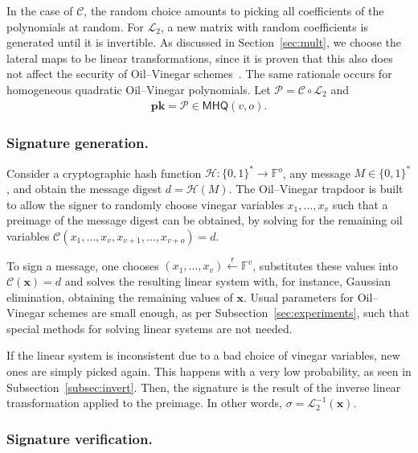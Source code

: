\documentclass[draft, 12pt, a4paper, oneside]{memoir}
\newcommand{\random}{\overset{\mathsf{r}}{\gets}}
\theoremstyle{definition}
\begin{document}
In the case of $\mathcal{C}$, the random choice amounts to picking all coefficients of the polynomials at random. For $\mathcal{L}_{2}$, a new matrix with random coefficients is generated until it is invertible. As discussed in Section~\ref{sec:mult}, we choose the lateral maps to be linear transformations, since it is proven that this also does not affect the security of Oil--Vinegar schemes~\cite[Section 3.1]{Braeken:200502}. The same rationale occurs for homogeneous quadratic Oil--Vinegar polynomials. Let $\mathcal{P} = \mathcal{C} \circ \mathcal{L}_{2}$ and
\begin{align}
  \mathbf{pk} = \mathcal{P} \in \mathsf{MHQ}(v, o).
\end{align}

\subsubsection{Signature generation.}

Consider a cryptographic hash function $\mathcal{H} : \{0, 1\}^{*} \to \mathbb{F}^{o}$, any message $M \in \{0, 1\}^{*}$, and obtain the message digest $d = \mathcal{H}(M)$. The Oil--Vinegar trapdoor is built to allow the signer to randomly choose vinegar variables $x_{1}, \dots, x_{v}$ such that a preimage of the message digest can be obtained, by solving for the remaining oil variables $\mathcal{C}(x_{1}, \dots, x_{v}, x_{v + 1}, \dots, x_{v + o}) = d$. 

To sign a message, one chooses $(x_{1}, \dots, x_{v}) \random \mathbb{F}^{v}$, substitutes these values into $\mathcal{C}(\mathbf{x}) = d$ and solves the resulting linear system with, for instance, Gaussian elimination, obtaining the remaining values of $\mathbf{x}$. Usual parameters for Oil--Vinegar schemes are small enough, as per Subsection~\ref{sec:experiments}, such that special methods for solving linear systems are not needed. 

If the linear system is inconsistent due to a bad choice of vinegar variables, new ones are simply picked again. This happens with a very low probability, as seen in Subsection~\ref{subsec:invert}. Then, the signature is the result of the inverse linear transformation applied to the preimage. In other words, $\sigma = \mathcal{L}_{2}^{-1}(\mathbf{x})$.

\subsubsection{Signature verification.}
\end{document}
